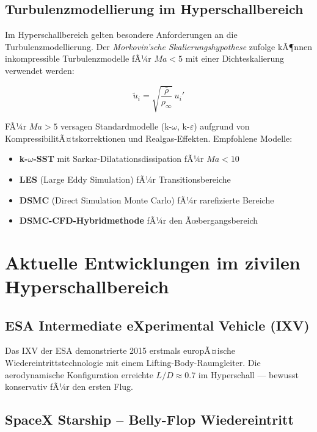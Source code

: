 ﻿\documentclass[12pt,a4paper]{article}
\newcommand{\Ma}{M\!a}
\begin{document}
\subsection{Turbulenzmodellierung im Hyperschallbereich}

Im Hyperschallbereich gelten besondere Anforderungen an die Turbulenzmodellierung.
Der \emph{Morkovin'sche Skalierungshypothese} zufolge kÃ¶nnen inkompressible
Turbulenzmodelle fÃ¼r $\Ma < 5$ mit einer Dichteskalierung verwendet werden:

\[
  \tilde{u}_i = \sqrt{\frac{\bar{\rho}}{\rho_\infty}}\, u_i'
\]

FÃ¼r $\Ma > 5$ versagen Standardmodelle (k-$\omega$, k-$\varepsilon$) aufgrund
von KompressibilitÃ¤tskorrektionen und Realgas-Effekten. Empfohlene Modelle:

\begin{itemize}[leftmargin=*]
  \item \textbf{k-$\omega$-SST} mit Sarkar-Dilatationsdissipation fÃ¼r $\Ma < 10$
  \item \textbf{LES} (Large Eddy Simulation) fÃ¼r Transitionsbereiche
  \item \textbf{DSMC} (Direct Simulation Monte Carlo) fÃ¼r rarefizierte Bereiche
  \item \textbf{DSMC-CFD-Hybridmethode} fÃ¼r den Ãœbergangsbereich
\end{itemize}

\section{Aktuelle Entwicklungen im zivilen Hyperschallbereich}

\subsection{ESA Intermediate eXperimental Vehicle (IXV)}

Das IXV der ESA demonstrierte 2015 erstmals europÃ¤ische Wiedereintrittstechnologie
mit einem Lifting-Body-Raumgleiter. Die aerodynamische Konfiguration erreichte
$L/D \approx 0.7$ im Hyperschall --- bewusst konservativ fÃ¼r den ersten Flug.

\subsection{SpaceX Starship -- Belly-Flop Wiedereintritt}
\end{document}
